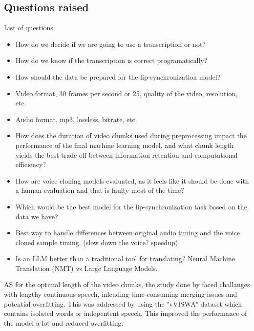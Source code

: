 \documentclass[12pt]{article}
\begin{document}
\subsection{Questions raised}
List of questions:
\begin{itemize}
    \item How do we decide if we are going to use a transcription or not?
    \item How do we know if the transcription is correct programatically?
    \item How should the data be prepared for the lip-synchronization model?
    \item Video format, 30 frames per second or 25, quality of the video, resolution, etc.
    \item Audio format, mp3, lossless, bitrate, etc.
    \item How does the duration of video chunks used during preprocessing impact the performance of the final machine learning model, and what chunk length yields the best trade-off between information retention and computational efficiency?
    \item How are voice cloning models evaluated, as it feels like it should be done with a human evaluation and that is faulty most of the time?
    \item Which would be the best model for the lip-synchronization task based on the data we have?
    \item Best way to handle differences between original audio timing and the voice cloned sample timing. (slow down the voice? speedup)
    \item Is an LLM better than a traditional tool for translating? Neural Machine Translation (NMT) vs Large Language Models.
\end{itemize}
AS for the optimal length of the video chunks, the study done by \cite{PAWAR2024100084} faced challanges with lengthy continuous speech, inlcuding time-consuming merging issues and potential overfitting. This was addressed by using the "vVISWA" dataset which contains isolated words or indepentent speech. This improved the performance of the model a lot and reduced overfitting.
\end{document}

